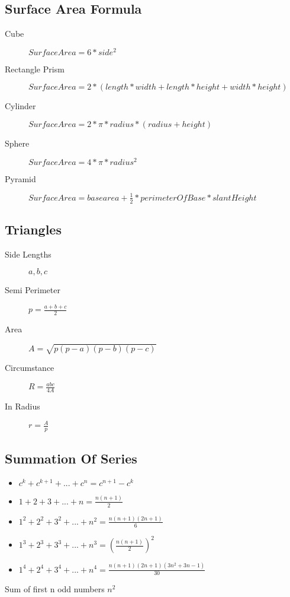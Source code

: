 \documentclass[10pt, a4paper,twocolumn]{article}
\begin{document}
\subsection{Surface Area Formula}
\begin{description}
    \item[Cube] 
        \begin{math}
            Surface Area = 6 *side^2
        \end{math}
    \item[Rectangle Prism] 
        \begin{math}
            Surface Area = 2 *(length*width+length*height+width*height)
        \end{math}
    \item[Cylinder] 
        \begin{math}
            Surface Area = 2*\pi*radius*(radius+height)
        \end{math}
    \item[Sphere] 
        \begin{math}
            Surface Area = 4*\pi*radius^2
        \end{math}
    \item[Pyramid] 
        \begin{math}
            Surface Area = base area + \frac{1}{2}*perimeterOfBase * slantHeight
        \end{math}
\end{description}

\subsection{Triangles}
\begin{description}
    \item[Side Lengths] \(a, b, c \)
    \item[Semi Perimeter] \( p = \frac{a+b+c}{2} \)
    \item[Area] \(A = \sqrt{p(p-a)(p-b)(p-c)}\)
    \item[Circumstance] \(R =  \frac{abc}{4A} \)
    \item[In Radius] \(r = \frac{A}{p}\) 
\end{description}
\subsection{Summation Of Series}
\begin{itemize}
    \item \(c^k + c^{k+1} +...+ c^n = c^{n+1} - c^k\)
    \item \(1+2+3+...+n=\frac{n(n+1)}{2}\)
    \item \(1^2+2^2+3^2+...+n^2=\frac{n(n+1)(2n+1)}{6}\)
    \item \(1^3+2^3+3^3+...+n^3=(\frac{n(n+1)}{2})^2\)
    \item \(1^4+2^4+3^4+...+n^4=\frac{n(n+1)(2n+1)(3n^2+3n-1)}{30}\)

\end{itemize}
    {    Sum of first n odd numbers} \(n^2\)
\end{document}
